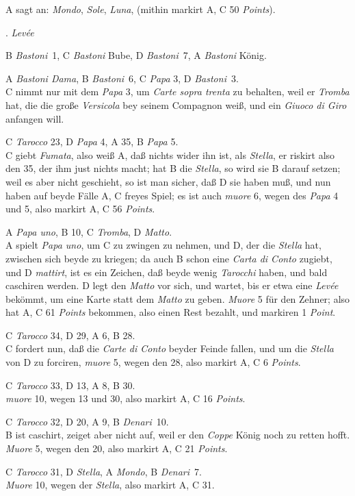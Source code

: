 \documentclass[11pt,a6paper,twoside]{article}
\newcounter{leveescnt}
\newenvironment{leveeslist}{
  \begin{list}
    {\arabic{leveescnt}. {\textit{Levée}}}
    {\usecounter{leveescnt}
      \setlength{\labelwidth}{2em}
      \setlength{\labelsep}{1em}
      \setlength{\itemsep}{0pt}
      \setlength{\parsep}{0pt}
      \setlength{\leftmargin}{1.5em}
      \setlength{\itemindent}{1em} %
    }
}{\end{list}}
\begin{document}
A sagt an: \textit{Mondo}, \textit{Sole}, \textit{Luna}, (mithin markirt A, C 50 \textit{Points}).

\begin{leveeslist}
\item B \textit{Bastoni}~1, C \textit{Bastoni} Bube, D \textit{Bastoni}~7, A \textit{Bastoni} König.
\item A \textit{Bastoni Dama}, B \textit{Bastoni}~6, C \textit{Papa} 3, D \textit{Bastoni}~3. \\C nimmt nur mit dem \textit{Papa} 3, um \textit{Carte sopra trenta} zu behalten, weil er \textit{Tromba} hat, die die große \textit{Versicola} bey seinem Compagnon weiß, und ein \textit{\mbox{Giuoco} di \mbox{Giro}} anfangen will.
\item C \textit{Tarocco} 23, D \textit{Papa} 4, A 35, B \textit{Papa} 5. \\C giebt \textit{Fumata}, also weiß A, daß nichts wider ihn ist, als \textit{Stella}, er riskirt also den 35, der ihm just nichts macht; hat B die \textit{Stella}, so wird sie B darauf setzen; weil es aber nicht geschieht, so ist man sicher, daß D sie haben muß, und nun haben auf beyde Fälle A, C freyes Spiel; es ist auch \textit{muore} 6, wegen des \textit{Papa} 4 und 5, also markirt A, C 56 \textit{Points}.
\item A \textit{Papa uno}, B 10, C \textit{Tromba}, D \textit{Matto}. \\A spielt \textit{Papa uno}, um C zu zwingen zu nehmen, und D, der die \textit{Stella} hat, zwischen sich beyde zu kriegen; da auch B schon eine \textit{Carta di Conto} zugiebt, und D \textit{mattirt}, ist es ein Zeichen, daß beyde wenig \textit{Tarocchi} haben, und bald caschiren werden. D legt den \textit{Matto} vor sich, und wartet, bis er etwa eine \textit{Levée} bekömmt, um eine Karte statt dem \textit{Matto} zu geben. \textit{Muore} 5 für den Zehner; also hat A, C 61 \textit{Points} bekommen, also einen Rest bezahlt, und markiren 1 \textit{Point}.
\item C \textit{Tarocco} 34, D 29, A 6, B 28. \\C fordert nun, daß die \textit{Carte di Conto} beyder Feinde fallen, und um die \textit{Stella} von D zu forciren, \textit{muore} 5, wegen den 28, also markirt A, C 6 \textit{Points}.
\item C \textit{Tarocco} 33, D 13, A 8, B 30. \\\textit{muore} 10, wegen 13 und 30, also markirt A, C 16 \textit{Points}.
\item C \textit{Tarocco} 32, D 20, A 9, B \textit{Denari}~10. \\B ist caschirt, zeiget aber nicht auf, weil er den \textit{Coppe} König noch zu retten hofft. \textit{Muore} 5, wegen den 20, also markirt A, C 21 \textit{Points}.
\item C \textit{Tarocco} 31, D \textit{Stella}, A \textit{Mondo}, B \textit{Denari}~7. \\\textit{Muore} 10, wegen der \textit{Stella}, also markirt A, C 31.
\end{leveeslist}
\end{document}
